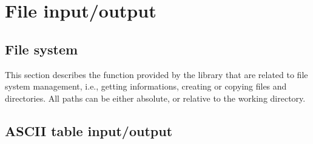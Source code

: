 \section{File input/output \label{SEC:support:file}}

\subsection{File system \label{SEC:support:file:system}}

This section describes the function provided by the \phypp library that are related to file system management, i.e., getting informations, creating or copying files and directories. All paths can be either absolute, or relative to the working directory.


\subsection{ASCII table input/output \label{SEC:support:file:ascii}}


